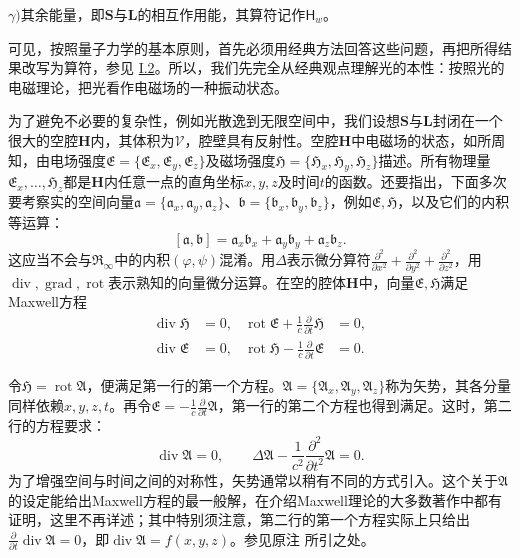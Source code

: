 \documentclass[fontsize=13pt,twoside,openany,headings=normal,parskip=false,bookmarkpackage=false,DIV=calc]{scrbook}
\begin{document}
\leavevmode{}\label{problem:III.6.2gamma}\textbf{$\gamma)$}其余能量，即$\boldsymbol{S}$与$\boldsymbol{L}$的相互作用能，其算符记作$\mathsf{H}_w$。

可见，按照量子力学的基本原则，首先必须用经典方法回答这些问题，再把所得结果改写为算符，参见 \hyperref[sec:I.2]{I.2}。所以，我们先完全从经典观点理解光的本性：按照光的电磁理论，把光看作电磁场的一种振动状态。

为了避免不必要的复杂性，例如光散逸到无限空间中，我们设想$\boldsymbol{S}$与$\boldsymbol{L}$封闭在一个很大的空腔$\boldsymbol H$内，其体积为$\mathcal V$，腔壁具有反射性。空腔$\boldsymbol H$中电磁场的状态，如所周知，由电场强度$\mathfrak E=\{\mathfrak E_x,\allowbreak \mathfrak E_y,\allowbreak \mathfrak E_z\}$及磁场强度$\mathfrak H=\{\mathfrak H_x,\allowbreak \mathfrak H_y,\allowbreak \mathfrak H_z\}$描述。所有物理量$\mathfrak E_x,\allowbreak \ldots,\allowbreak \mathfrak H_z$都是$\boldsymbol H$内任意一点的直角坐标$x,\allowbreak y,\allowbreak z$及时间$t$的函数。还要指出，下面多次要考察实的空间向量$\mathfrak a=\{\mathfrak a_x,\allowbreak \mathfrak a_y,\allowbreak \mathfrak a_z\}$、$\mathfrak b=\{\mathfrak b_x,\allowbreak \mathfrak b_y,\allowbreak \mathfrak b_z\}$，例如$\mathfrak E,\allowbreak \mathfrak H$，以及它们的内积等运算：
\[
 [\mathfrak a,\mathfrak b]=\mathfrak a_x\mathfrak b_x+\mathfrak a_y\mathfrak b_y+\mathfrak a_z\mathfrak b_z.
\]
这应当不会与$\mathfrak R_\infty$中的内积$(\varphi,\allowbreak \psi)$混淆。用$\Delta$表示微分算符$\frac{\partial^2}{\partial x^2}+\frac{\partial^2}{\partial y^2}+\frac{\partial^2}{\partial z^2}$，用$\operatorname{div},\allowbreak \operatorname{grad},\allowbreak \operatorname{rot}$表示熟知的向量微分运算。在空的腔体$\boldsymbol H$中，向量$\mathfrak E,\allowbreak \mathfrak H$满足Maxwell方程\hypertarget{origpage-137}{}\label{origpage-137}\begin{align*}
 \operatorname{div}\mathfrak H&=0,&
 \operatorname{rot}\mathfrak E+\frac1c\frac{\partial}{\partial t}\mathfrak H&=0,\\
 \operatorname{div}\mathfrak E&=0,&
 \operatorname{rot}\mathfrak H-\frac1c\frac{\partial}{\partial t}\mathfrak E&=0.
\end{align*}

令$\mathfrak H=\operatorname{rot}\mathfrak A$，便满足第一行的第一个方程。$\mathfrak A=\{\mathfrak A_x,\allowbreak \mathfrak A_y,\allowbreak \mathfrak A_z\}$称为矢势，其各分量同样依赖$x,\allowbreak y,\allowbreak z,\allowbreak t$。再令$\mathfrak E=-\frac1c\frac{\partial}{\partial t}\mathfrak A$，第一行的第二个方程也得到满足。这时，第二行的方程要求：
\begin{equation}
 \operatorname{div}\mathfrak A=0,\qquad
 \Delta\mathfrak A-\frac1{c^2}\frac{\partial^2}{\partial t^2}\mathfrak A=0.
 \tag{A}\label{eq:III.6.A}
\end{equation}
为了增强空间与时间之间的对称性，矢势通常以稍有不同的方式引入。这个关于$\mathfrak A$的设定能给出Maxwell方程的最一般解，在介绍Maxwell理论的大多数著作中都有证明，这里不再详述；其中特别须注意，第二行的第一个方程实际上只给出$\frac{\partial}{\partial t}\operatorname{div}\mathfrak A=0$，即$\operatorname{div}\mathfrak A=f(x,\allowbreak y,\allowbreak z)$。参见原注 \hyperlink{note-139}{} 所引之处。
\end{document}
